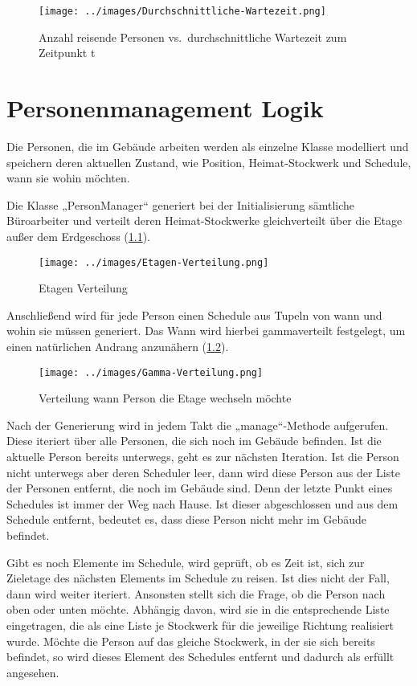 \documentclass[envcountsame, envcountchap, deutsch]{i-studis}
\begin{document}
\begin{figure}
\centering
\texttt{[image: ../images/Durchschnittliche-Wartezeit.png]}
\caption{Anzahl reisende Personen vs.~durchschnittliche Wartezeit zum
Zeitpunkt t\label{avgWait}}
\end{figure}

\hypertarget{personenmanagement-logik}{%
\chapter{Personenmanagement Logik}\label{personenmanagement-logik}}

Die Personen, die im Gebäude arbeiten werden als einzelne Klasse
modelliert und speichern deren aktuellen Zustand, wie Position,
Heimat-Stockwerk und Schedule, wann sie wohin möchten.

Die Klasse „PersonManager`` generiert bei der Initialisierung sämtliche
Büroarbeiter und verteilt deren Heimat-Stockwerke gleichverteilt über
die Etage außer dem Erdgeschoss (\ref{Etagen-Verteilung}).

\begin{figure}
\centering
\texttt{[image: ../images/Etagen-Verteilung.png]}
\caption{Etagen Verteilung\label{Etagen-Verteilung}}
\end{figure}

Anschließend wird für jede Person einen Schedule aus Tupeln von wann und
wohin sie müssen generiert. Das Wann wird hierbei gammaverteilt
festgelegt, um einen natürlichen Andrang anzunähern
(\ref{Gamma-Verteilung}).

\begin{figure}
\centering
\texttt{[image: ../images/Gamma-Verteilung.png]}
\caption{Verteilung wann Person die Etage wechseln
möchte\label{Gamma-Verteilung}}
\end{figure}

Nach der Generierung wird in jedem Takt die „manage``-Methode
aufgerufen. Diese iteriert über alle Personen, die sich noch im Gebäude
befinden. Ist die aktuelle Person bereits unterwegs, geht es zur
nächsten Iteration. Ist die Person nicht unterwegs aber deren Scheduler
leer, dann wird diese Person aus der Liste der Personen entfernt, die
noch im Gebäude sind. Denn der letzte Punkt eines Schedules ist immer
der Weg nach Hause. Ist dieser abgeschlossen und aus dem Schedule
entfernt, bedeutet es, dass diese Person nicht mehr im Gebäude befindet.

Gibt es noch Elemente im Schedule, wird geprüft, ob es Zeit ist, sich
zur Zieletage des nächsten Elements im Schedule zu reisen. Ist dies
nicht der Fall, dann wird weiter iteriert. Ansonsten stellt sich die
Frage, ob die Person nach oben oder unten möchte. Abhängig davon, wird
sie in die entsprechende Liste eingetragen, die als eine Liste je
Stockwerk für die jeweilige Richtung realisiert wurde. Möchte die Person
auf das gleiche Stockwerk, in der sie sich bereits befindet, so wird
dieses Element des Schedules entfernt und dadurch als erfüllt angesehen.
\end{document}
